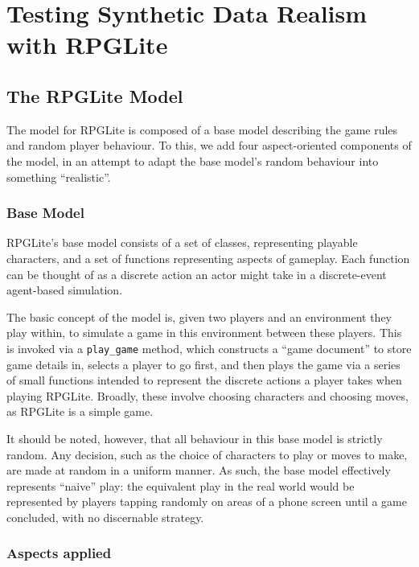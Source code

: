 \chapter{Testing Synthetic Data Realism with RPGLite}

\section{The RPGLite Model}

The model for RPGLite is composed of a base model describing the game rules and
random player behaviour. To this, we add four aspect-oriented components of the
model, in an attempt to adapt the base model's random behaviour into something
``realistic''.

\subsection{Base Model}
RPGLite's base model consists of a set of classes, representing playable
characters, and a set of functions representing aspects of gameplay. Each
function can be thought of as a discrete action an actor might take in a
discrete-event agent-based simulation. 
\par

The basic concept of the model is, given two players and an environment they
play within, to simulate a game in this environment between these players. This
is invoked via a \lstinline{play_game} method, which constructs a ``game
document'' to store game details in, selects a player to go first, and then
plays the game via a series of small functions intended to represent the
discrete actions a player takes when playing RPGLite. Broadly, these involve
choosing characters and choosing moves, as RPGLite is a simple game.
\par

It should be noted, however, that all behaviour in this base model is strictly
random. Any decision, such as the choice of characters to play or moves to make,
are made at random in a uniform manner. As such, the base model effectively
represents ``naive'' play: the equivalent play in the real world would be
represented by players tapping randomly on areas of a phone screen until a game
concluded, with no discernable strategy.

\subsection{Aspects applied}

